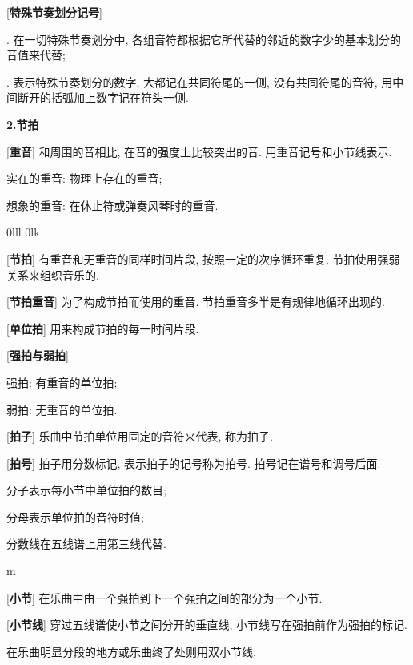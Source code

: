 [\textbf{特殊节奏划分记号}] \par
{}. 在一切特殊节奏划分中, 各组音符都根据它所代替的邻近的数字少的基本划分的音值来代替;\par
{}. 表示特殊节奏划分的数字, 大都记在共同符尾的一侧, 没有共同符尾的音符, 用中间断开的括弧加上数字记在符头一侧.\par

\clearpage

\begin{center}
 \textbf{2.节拍}\\
\end{center}

[\textbf{重音}] 和周围的音相比, 在音的强度上比较突出的音. 用重音记号和小节线表示.\par
\qquad 实在的重音: 物理上存在的重音;\par
\qquad 想象的重音: 在休止符或弹奏风琴时的重音.\par
\startextract
\Notes \isluru 0l\usf l\qa l \tslur 0l\qa k\en
\zendextract

[\textbf{节拍}] 有重音和无重音的同样时间片段, 按照一定的次序循环重复. 节拍使用强弱关系来组织音乐的.\par

[\textbf{节拍重音}] 为了构成节拍而使用的重音. 节拍重音多半是有规律地循环出现的.\par

[\textbf{单位拍}] 用来构成节拍的每一时间片段.\par

[\textbf{强拍与弱拍}] \par
\qquad 强拍: 有重音的单位拍;\par
\qquad 弱拍: 无重音的单位拍.\par

[\textbf{拍子}] 乐曲中节拍单位用固定的音符来代表, 称为拍子.\par

[\textbf{拍号}] 拍子用分数标记, 表示拍子的记号称为拍号. 拍号记在谱号和调号后面.\par
\qquad 分子表示每小节中单位拍的数目;\par
\qquad 分母表示单位拍的音符时值;\par
\qquad 分数线在五线谱上用第三线代替.\par
{}
\startextract
\Notes \sh m\en
\zendextract

[\textbf{小节}] 在乐曲中由一个强拍到下一个强拍之间的部分为一个小节.\par

[\textbf{小节线}] 穿过五线谱使小节之间分开的垂直线, 小节线写在强拍前作为强拍的标记.\par
\qquad 在乐曲明显分段的地方或乐曲终了处则用双小节线.\par

